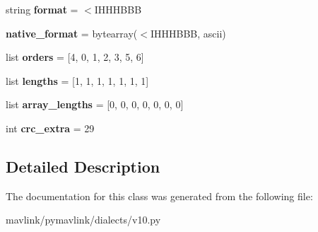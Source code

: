 \begin{DoxyCompactItemize}
\mbox{\label{classpymavlink_1_1dialects_1_1v10_1_1MAVLink__data__transmission__handshake__message_a15bd520c7faca98bbbae6e12c39f2163}} 
string {\bfseries format} = \textquotesingle{}$<$I\+H\+H\+H\+B\+BB\textquotesingle{}
\item 
\mbox{\label{classpymavlink_1_1dialects_1_1v10_1_1MAVLink__data__transmission__handshake__message_a2b951173dcf4325e9c1cc0b83b220c49}} 
{\bfseries native\+\_\+format} = bytearray(\textquotesingle{}$<$I\+H\+H\+H\+B\+BB\textquotesingle{}, \textquotesingle{}ascii\textquotesingle{})
\item 
\mbox{\label{classpymavlink_1_1dialects_1_1v10_1_1MAVLink__data__transmission__handshake__message_ab3a1ddab714e1fc0a0c3760fe64a8249}} 
list {\bfseries orders} = \mbox{[}4, 0, 1, 2, 3, 5, 6\mbox{]}
\item 
\mbox{\label{classpymavlink_1_1dialects_1_1v10_1_1MAVLink__data__transmission__handshake__message_ace4d2c59d6911e884bfdd737c797e8c6}} 
list {\bfseries lengths} = \mbox{[}1, 1, 1, 1, 1, 1, 1\mbox{]}
\item 
\mbox{\label{classpymavlink_1_1dialects_1_1v10_1_1MAVLink__data__transmission__handshake__message_acd9af47652087d612e28ab4161bc2251}} 
list {\bfseries array\+\_\+lengths} = \mbox{[}0, 0, 0, 0, 0, 0, 0\mbox{]}
\item 
\mbox{\label{classpymavlink_1_1dialects_1_1v10_1_1MAVLink__data__transmission__handshake__message_aa2f5c3fbbb9e873954ea7c3c8675f534}} 
int {\bfseries crc\+\_\+extra} = 29
\end{DoxyCompactItemize}


\subsection{Detailed Description}
\begin{DoxyVerb}\end{DoxyVerb}
 

The documentation for this class was generated from the following file\+:\begin{DoxyCompactItemize}
\item 
mavlink/pymavlink/dialects/v10.\+py\end{DoxyCompactItemize}

